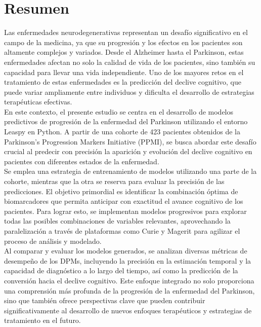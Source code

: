 \chapter{Resumen}

Las enfermedades neurodegenerativas representan un desafío significativo en el campo de la medicina, ya que su progresión y los efectos en los pacientes son altamente complejos y variados. Desde el Alzheimer hasta el Parkinson, estas enfermedades afectan no solo la calidad de vida de los pacientes, sino también su capacidad para llevar una vida independiente. Uno de los mayores retos en el tratamiento de estas enfermedades es la predicción del declive cognitivo, que puede variar ampliamente entre individuos y dificulta el desarrollo de estrategias terapéuticas efectivas.\\

En este contexto, el presente estudio se centra en el desarrollo de modelos predictivos de progresión de la enfermedad del Parkinson utilizando el entorno Leaspy en Python. A partir de una cohorte de 423 pacientes obtenidos de la Parkinson's Progression Markers Initiative (PPMI), se busca abordar este desafío crucial al predecir con precisión la aparición y evolución del declive cognitivo en pacientes con diferentes estados de la enfermedad.\\

Se emplea una estrategia de entrenamiento de modelos utilizando una parte de la cohorte, mientras que la otra se reserva para evaluar la precisión de las predicciones. El objetivo primordial es identificar la combinación óptima de biomarcadores que permita anticipar con exactitud el avance cognitivo de los pacientes. Para lograr esto, se implementan modelos progresivos para explorar todas las posibles combinaciones de variables relevantes, aprovechando la paralelización a través de plataformas como Curie y Magerit para agilizar el proceso de análisis y modelado.\\

Al comparar y evaluar los modelos generados, se analizan diversas métricas de desempeño de los DPMs, incluyendo la precisión en la estimación temporal y la capacidad de diagnóstico a lo largo del tiempo, así como la predicción de la conversión hacia el declive cognitivo. Este enfoque integrado no solo proporciona una comprensión más profunda de la progresión de la enfermedad del Parkinson, sino que también ofrece perspectivas clave que pueden contribuir significativamente al desarrollo de nuevos enfoques terapéuticos y estrategias de tratamiento en el futuro.

